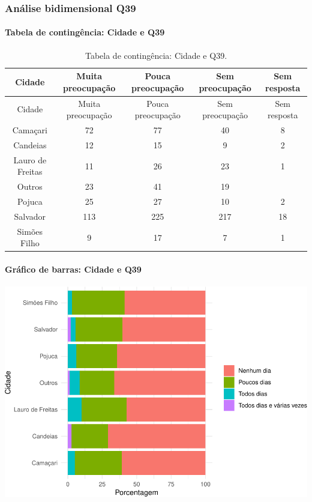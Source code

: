 \documentclass[]{article}
\let\oldparagraph\paragraph
\renewcommand{\paragraph}[1]{\oldparagraph{#1}\mbox{}}
\begin{document}
\cleardoublepage

\hypertarget{anuxe1lise-bidimensional-q39}{%
\subsubsection{Análise bidimensional Q39}\label{anuxe1lise-bidimensional-q39}}

\hypertarget{tabela-de-continguxeancia-cidade-e-q39}{%
\paragraph{Tabela de contingência: Cidade e Q39}\label{tabela-de-continguxeancia-cidade-e-q39}}

\begin{longtable}[]{@{}ccccc@{}}
\caption{\label{tab:unnamed-chunk-1487}Tabela de contingência: Cidade e Q39.}\tabularnewline
\toprule
Cidade & Muita preocupação & Pouca preocupação & Sem preocupação & Sem resposta\tabularnewline
\midrule
\endfirsthead
\toprule
Cidade & Muita preocupação & Pouca preocupação & Sem preocupação & Sem resposta\tabularnewline
\midrule
\endhead
Camaçari & 72 & 77 & 40 & 8\tabularnewline
Candeias & 12 & 15 & 9 & 2\tabularnewline
Lauro de Freitas & 11 & 26 & 23 & 1\tabularnewline
Outros & 23 & 41 & 19 &\tabularnewline
Pojuca & 25 & 27 & 10 & 2\tabularnewline
Salvador & 113 & 225 & 217 & 18\tabularnewline
Simões Filho & 9 & 17 & 7 & 1\tabularnewline
\bottomrule
\end{longtable}

\hypertarget{gruxe1fico-de-barras-cidade-e-q39}{%
\paragraph{Gráfico de barras: Cidade e Q39}\label{gruxe1fico-de-barras-cidade-e-q39}}

\begin{center}\includegraphics[width=0.75\linewidth]{relatorio_covid19_files/figure-latex/unnamed-chunk-1488-1} \end{center}
\end{document}
